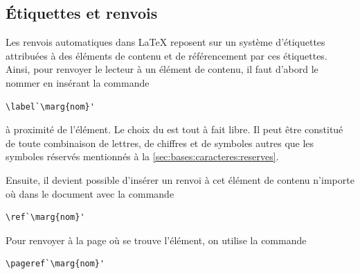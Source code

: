 \subsection{Étiquettes et renvois}
\label{sec:organisation:renvois:etiquettes}

Les renvois automatiques dans {\LaTeX} reposent sur un système
d'étiquettes attribuées à des éléments de contenu et de référencement
par ces étiquettes. Ainsi, pour renvoyer le lecteur à un élément de
contenu, il faut d'abord le nommer en insérant la commande
\begin{lstlisting}
\label`\marg{nom}'
\end{lstlisting}
à proximité de l'élément. Le choix du  est tout à fait libre. Il
peut être constitué de toute combinaison de lettres, de chiffres et de
symboles autres que les symboles réservés mentionnés à la
\autoref{sec:bases:caracteres:reserves}.

Ensuite, il devient possible d'insérer un renvoi à cet élément de contenu
n'importe où dans le document avec la commande
\begin{lstlisting}
\ref`\marg{nom}'
\end{lstlisting}
Pour renvoyer à la page où se trouve l'élément, on utilise la commande
\begin{lstlisting}
\pageref`\marg{nom}'
\end{lstlisting}

